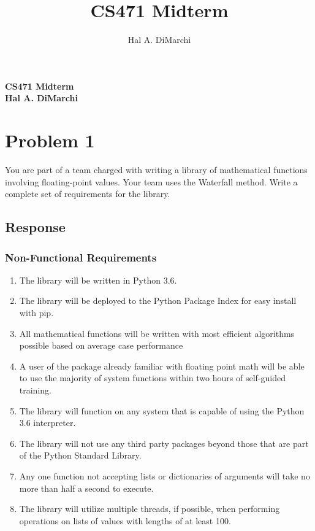 \documentclass{article}
\title{CS471 Midterm}
\author{Hal A. DiMarchi}
\begin{document}
\begin{titlepage}
  \normalsize
  \centering
  \vfill
  {\bfseries\Large
    CS471 Midterm \\
    Hal A. DiMarchi \\
    }
  \vfill
\end{titlepage}
\newpage
\section{Problem 1}
  You are part of a team charged with writing a library of mathematical functions
  involving floating-point values. Your team uses the Waterfall method.
  Write a complete set of requirements for the library.
  \subsection{Response}
    \subsubsection{Non-Functional Requirements}
      \begin{enumerate}
        \item The library will be written in Python 3.6.
        \item The library will be deployed to the Python Package Index for easy install with pip.
        \item All mathematical functions will be written with most efficient algorithms possible based on average case performance
        \item A user of the package already familiar with floating point math will
              be able to use the majority of system functions within two hours of self-guided training.
        \item The library will function on any system that is capable of using the Python 3.6 interpreter.
        \item The library will not use any third party packages beyond those that are part of the Python Standard Library.
        \item Any one function not accepting lists or dictionaries of arguments will take no more than half a second to execute.
        \item The library will utilize multiple threads, if possible, when performing operations on lists of values with lengths of at least 100.
      \end{enumerate}
\end{document}
